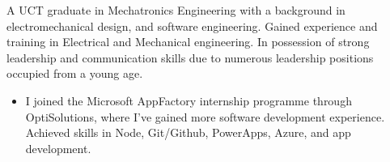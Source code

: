 \documentclass[10pt,a4paper]{altacv}
\begin{document}

\begin{fullwidth}
\makecvheader
\end{fullwidth}

\begin{fullwidth}
{A UCT graduate in Mechatronics Engineering with a background in electromechanical design, and software engineering. Gained experience and training in Electrical and Mechanical engineering. In possession of strong leadership and communication skills due to numerous leadership positions occupied from a young age.}
\end{fullwidth}




\begin{itemize}
\item I joined the Microsoft AppFactory internship programme through OptiSolutions, where I’ve gained more software development experience. Achieved skills in Node, Git/Github, PowerApps, Azure, and app development.  
\end{itemize}
\end{document}
